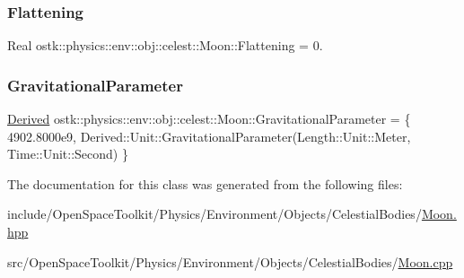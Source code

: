 \subsubsection{\texorpdfstring{Flattening}{Flattening}}
{\footnotesize\ttfamily Real ostk\+::physics\+::env\+::obj\+::celest\+::\+Moon\+::\+Flattening = 0.\hspace{0.3cm}{\ttfamily [static]}}

\mbox{\label{classostk_1_1physics_1_1env_1_1obj_1_1celest_1_1_moon_ad9b61b93eb0855dce7f969d68932f5c6}} 
\subsubsection{\texorpdfstring{Gravitational\+Parameter}{GravitationalParameter}}
{\footnotesize\ttfamily \hyperlink{classostk_1_1physics_1_1units_1_1_derived}{Derived} ostk\+::physics\+::env\+::obj\+::celest\+::\+Moon\+::\+Gravitational\+Parameter = \{ 4902.\+8000e9, Derived\+::\+Unit\+::\+Gravitational\+Parameter(\+Length\+::\+Unit\+::\+Meter, Time\+::\+Unit\+::\+Second) \}\hspace{0.3cm}{\ttfamily [static]}}



The documentation for this class was generated from the following files\+:\begin{DoxyCompactItemize}
\item 
include/\+Open\+Space\+Toolkit/\+Physics/\+Environment/\+Objects/\+Celestial\+Bodies/\hyperlink{_moon_8hpp}{Moon.\+hpp}\item 
src/\+Open\+Space\+Toolkit/\+Physics/\+Environment/\+Objects/\+Celestial\+Bodies/\hyperlink{_moon_8cpp}{Moon.\+cpp}\end{DoxyCompactItemize}
